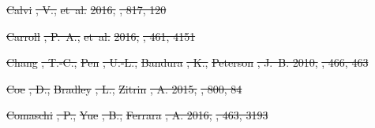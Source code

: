 \documentclass[numberedappendix]{emulateapj}
\providecommand{\DIFdel}[1]{{\protect\color{red}\sout{#1}}}                      %
\begin{document}
\DIFdel{Calvi}%
\DIFdel{, V., }%
\DIFdel{et~al.}%
\DIFdel{2016, }%
\DIFdel{, 817, 120
}%

\DIFdel{Carroll}%
\DIFdel{, P.~A., }%
\DIFdel{et~al.}%
\DIFdel{2016, }%
\DIFdel{, 461, 4151
}%

\DIFdel{Chang}%
\DIFdel{, T.-C., }%
\DIFdel{Pen}%
\DIFdel{, U.-L., }%
\DIFdel{Bandura}%
\DIFdel{, K., }%
\DIFdel{Peterson}%
\DIFdel{, J.~B. 2010, }%
\DIFdel{,
  466, 463
}%

\DIFdel{Coe}%
\DIFdel{, D., }%
\DIFdel{Bradley}%
\DIFdel{, L., }%
\DIFdel{Zitrin}%
\DIFdel{, A. 2015, }%
\DIFdel{, 800, 84
}%

\DIFdel{Comaschi}%
\DIFdel{, P., }%
\DIFdel{Yue}%
\DIFdel{, B., }%
\DIFdel{Ferrara}%
\DIFdel{, A. 2016, }%
\DIFdel{, 463, 3193
}%
\end{document}
